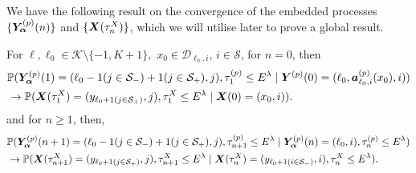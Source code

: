We have the following result on the convergence of the embedded processes \(\{\bm{Y}_{\bm{\alpha}}^{(p)}(n)\}\) and \(\{\boldsymbol X(\tau_n^X)\}\), which we will utilise later to prove a global result.
\begin{cor}\label{cor: aln222222} For \(\ell,\ell_0\in \mathcal K \setminus \{-1,K+1\},\) \(x_0\in\mathcal D_{\ell_0,i}\), \(i\in\mathcal S\), 
	for \(n=0\), then
	\begin{align}
		&\mathbb P(\bm{Y}_{\bm{\alpha}}^{(p)}(1) = (\ell_0-1(j\in\mathcal{S}_-)+1(j\in\mathcal{S}_+),j), \tau_1^{(p)}\leq E^\lambda
            	 \mid \boldsymbol Y^{(p)}(0) = (\ell_0,\boldsymbol a_{\ell_0,i}^{(p)}(x_0),i)) \nonumber
		\\&\to  
			\mathbb P(\boldsymbol X(\tau_1^X) = (y_{\ell_0+1(j\in\mathcal{S}_+)}, j), \tau_1^{X}\leq E^\lambda \mid \boldsymbol X(0) = (x_0,i)).\label{eqn: lim 1}
	\end{align}
	and for \(n\geq 1\), then, 
	\begin{align}
		&\mathbb P(\bm{Y}_{\bm{\alpha}}^{(p)}(n+1) = (\ell_0-1(j\in\mathcal{S}_-)+1(j\in\mathcal{S}_+),j), \tau_{n+1}^{(p)}\leq E^\lambda
            	 \mid \bm{Y}_{\bm{\alpha}}^{(p)}(n) = (\ell_0,i), \tau_n^{(p)}\leq E^\lambda) \nonumber
		\\&\to  
			\mathbb P(\boldsymbol X(\tau_{n+1}^X) = (y_{\ell_0+1(j\in\mathcal{S}_+)}, j), \tau_{n+1}^{X}\leq E^\lambda \mid \boldsymbol X(\tau_{n}^X) = (y_{\ell_0+1(i\in\mathcal{S}_-)},i), \tau_n^{X}\leq E^\lambda).\label{eqn: ddddddd}
	\end{align}
\end{cor}
